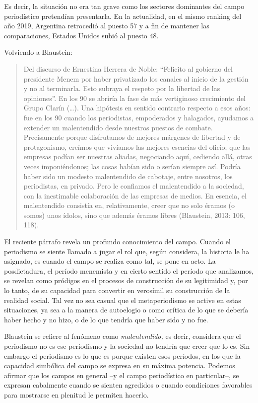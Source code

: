 Es decir, la situación no era tan grave como los sectores dominantes del campo periodístico pretendían presentarla. En la actualidad, en el mismo ranking del año 2019, Argentina retrocedió al puesto 57 y a fin de mantener las comparaciones, Estados Unidos subió al puesto 48.

Volviendo a Blaustein:

\begin{quote}
Del discurso de Ernestina Herrera de Noble: ``Felicito al gobierno del presidente Menem por haber privatizado los canales al inicio de la gestión y no al terminarla. Esto subraya el respeto por la libertad de las opiniones''. En los 90 se abriría la fase de más vertiginoso crecimiento del Grupo Clarín (\ldots). Una hipótesis en sentido contrario respecto a esos años: fue en los 90 cuando los periodistas, empoderados y halagados, ayudamos a extender un malentendido desde nuestros puestos de combate. Precisamente porque disfrutamos de mejores márgenes de libertad y de protagonismo, creímos que vivíamos las mejores esencias del oficio; que las empresas podían ser nuestras aliadas, negociando aquí, cediendo allá, otras veces imponiéndonos; las cosas habían sido o serían siempre así. Podría haber sido un modesto malentendido de cabotaje, entre nosotros, los periodistas, en privado. Pero le confiamos el malentendido a la sociedad, con la inestimable colaboración de las empresas de medios. En esencia, el malentendido consistía en, relativamente, creer que no solo éramos (o somos) unos ídolos, sino que además éramos libres (Blaustein, 2013: 106, 118).
\end{quote}

El reciente párrafo revela un profundo conocimiento del campo. Cuando el periodismo se siente llamado a jugar el rol que, según considera, la historia le ha asignado, es cuando el campo se realiza como tal, se pone en acto. La posdictadura, el período menemista y en cierto sentido el período que analizamos, se revelan como pródigos en el procesos de construcción de su legitimidad y, por lo tanto, de su capacidad para convertir en verosímil su construcción de la realidad social. Tal vez no sea casual que el metaperiodismo se active en estas situaciones, ya sea a la manera de autoelogio o como crítica de lo que se debería haber hecho y no hizo, o de lo que tendría que haber sido y no fue.

Blaustein se refiere al fenómeno como \emph{malentendido,} es decir, considera que el periodismo no es ese periodismo y la sociedad no tendría que creer que lo es. Sin embargo el periodismo es lo que es porque existen esos períodos, en los que la capacidad simbólica del campo se expresa en su máxima potencia. Podemos afirmar que los campos en general --y el campo periodístico en particular--, se expresan cabalmente cuando se sienten agredidos o cuando condiciones favorables para mostrarse en plenitud le permiten hacerlo.

